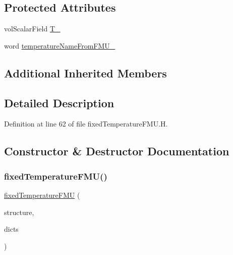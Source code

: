 \subsection*{Protected Attributes}
\begin{DoxyCompactItemize}
\item 
vol\+Scalar\+Field \hyperlink{classFoam_1_1powerModels_1_1fixedTemperatureFMU_a97c6919892227364774ffd51f3fa625b}{T\+\_\+}
\item 
word \hyperlink{classFoam_1_1powerModels_1_1fixedTemperatureFMU_a3f2d941afd3e595db25708d37f942090}{temperature\+Name\+From\+F\+M\+U\+\_\+}
\end{DoxyCompactItemize}
\subsection*{Additional Inherited Members}


\subsection{Detailed Description}


Definition at line 62 of file fixed\+Temperature\+F\+M\+U.\+H.



\subsection{Constructor \& Destructor Documentation}
\mbox{\label{classFoam_1_1powerModels_1_1fixedTemperatureFMU_ae3dcea8d723281650685d92321b31271}} 
\subsubsection{\texorpdfstring{fixed\+Temperature\+F\+M\+U()}{fixedTemperatureFMU()}}
{\footnotesize\ttfamily \hyperlink{classFoam_1_1powerModels_1_1fixedTemperatureFMU}{fixed\+Temperature\+F\+MU} (\begin{DoxyParamCaption}\item[{\hyperlink{classFoam_1_1structure}{structure} \&}]{structure,  }\item[{const dictionary \&}]{dicts }\end{DoxyParamCaption})}

